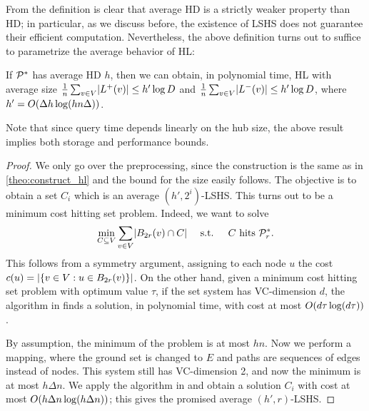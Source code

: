 From the definition is clear that average HD is a strictly weaker property than HD; in particular, as we discuss before, the existence of LSHS does not guarantee their efficient computation.
Nevertheless, the above definition turns out to suffice to parametrize the average behavior of HL:
\begin{theorem}\label{theo:preproc_avg}
If $\mathcal{P}^*$ has average HD $h$, then we can obtain, in polynomial time, HL with average size 
$\frac{1}{n}\sum_{v\in V} \lvert L^+(v)\rvert \leq h'\log D$ and 
$\frac{1}{n}\sum_{v\in V} \lvert L^-(v)\rvert \leq h'\log D$,
where $h'=O(\Delta h\log (hn\Delta))$.
\end{theorem}
Note that since query time depends linearly on the hub size, the above result implies both storage and performance bounds.
\begin{proof}
We only go over the preprocessing, since the construction is the same as in \cref{theo:construct_hl} and the bound for the size easily follows. 
The objective is to obtain a set $C_i$ which is an average $(h',2^i)$-LSHS.
This turns out to be a minimum cost hitting set problem.
Indeed, we want to solve
\[
\min_{C\subseteq V} \sum_{v\in V}\lvert B_{2r}(v)\cap C\rvert  \quad \text{ s.t. } \quad C \text{ hits } \mathcal{P}^*_r.
\]
This follows from a symmetry argument, assigning to each node $u$ the cost $c(u)=\lvert\{v\in V: u\in B_{2r}(v)\}\rvert$.
On the other hand, given a minimum cost hitting set problem with optimum value $\tau$, if the set system has VC-dimension $d$, the algorithm in \cite{vc_dim_hitting} finds a solution, in polynomial time, with cost at most $O(d\tau\log(d\tau))$.

By assumption, the minimum of the problem is at most $hn$.
Now we perform a mapping, where the ground set is changed to $E$ and paths are sequences of edges instead of nodes.
This system still has VC-dimension 2, and now the minimum is at most $h\Delta n$.
We apply the algorithm in \cite{vc_dim_hitting} and obtain a solution $C_i$ with cost at most $O(h\Delta n\log(h\Delta n))$; this gives the promised average $(h',r)$-LSHS.
\end{proof}
